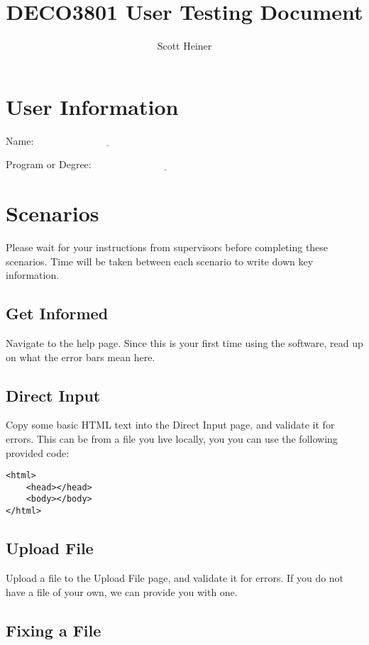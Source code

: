 \documentclass[11pt]{article}
\title{\bf DECO3801 User Testing Document}
\author{Scott Heiner}
\date{}
\begin{document}
\maketitle

\section*{User Information}

Name: $\underline{\hspace{6cm}}$

Program or Degree: $\underline{\hspace{6cm}}$

\section*{Scenarios}

Please wait for your instructions from supervisors before completing these scenarios. Time will be taken between each scenario to write down key information.

\subsection*{Get Informed}

Navigate to the help page. Since this is your first time using the software, read up on what the error bars mean here.

\subsection*{Direct Input}

Copy some basic HTML text into the Direct Input page, and validate it for errors. This can be from a file you hve locally, you you can use the following provided code:

\begin{verbatim}
<html>
	<head></head>
	<body></body>
</html>
\end{verbatim}

\subsection*{Upload File}

Upload a file to the Upload File page, and validate it for errors. If you do not have a file of your own, we can provide you with one.

\subsection*{Fixing a File}
\end{document}
